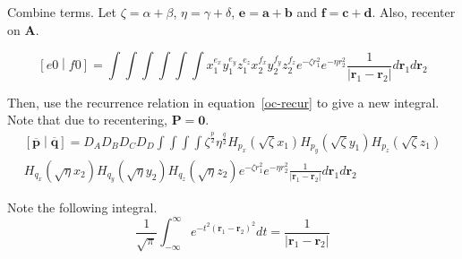 \documentclass{article}
\begin{document}
Combine terms. Let $\zeta = \alpha + \beta$, $\eta = \gamma + \delta$, $\mathbf{e} = \mathbf{a} + \mathbf{b}$ and $\mathbf{f} = \mathbf{c} + \mathbf{d}$. Also, recenter on $\mathbf{A}$.

\begin{equation}
  \left[e0\middle|f0\right] = \int\int\int\int\int\int x_1^{e_x}y_1^{e_y} z_1^{e_z} x_2^{f_x} y_2^{f_y}z_2^{f_z} e^{-\zeta r_1^2}e^{-\eta r_2^2}\frac{1}{\left|\mathbf{r}_1 - \mathbf{r}_2\right|} d\mathbf{r}_1 d\mathbf{r}_2
\end{equation}


Then, use the recurrence relation in equation~\ref{oc-recur} to give a new integral. Note that due to recentering, $\mathbf{P} = \mathbf{0}$.
\begin{multline}
  \left[\overline{\mathbf{p}}\middle|\overline{\mathbf{q}}\right] = D_A D_B D_C D_D\int\int\int\int \zeta^{\frac{p}{2}} \eta^{\frac{q}{2}} H_{p_x}\left(\sqrt{\zeta} x_1\right) H_{p_y}\left(\sqrt{\zeta} y_1\right) H_{p_z}\left(\sqrt{\zeta} z_1\right) \\
  H_{q_x}\left(\sqrt{\eta}x_2\right)H_{q_y}\left(\sqrt{\eta}y_2\right)H_{q_z}\left(\sqrt{\eta}z_2\right) e^{-\zeta r_1^2}e^{-\eta r_2^2} \frac{1}{\left|\mathbf{r}_1 - \mathbf{r}_2\right|} d\mathbf{r}_1 d\mathbf{r}_2
  \label{oc-hermite-integral}
\end{multline}

Note the following integral.
\begin{equation}
  \frac{1}{\sqrt{\pi}} \int_{-\infty}^\infty e^{-t^2\left(\mathbf{r}_1 - \mathbf{r}_2\right)^2} dt = \frac{1}{\left|\mathbf{r}_1 - \mathbf{r}_2\right|}
  \label{jesus-kernel}
\end{equation}
\end{document}
